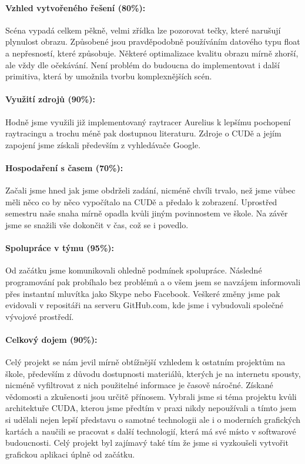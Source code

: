 \documentclass[11pt,a4paper]{article}
\begin{document}
\paragraph{Vzhled vytvořeného řešení (80\%):} 
Scéna vypadá celkem pěkně, velmi zřídka lze pozorovat tečky, které narušují plynulost obrazu. Způsobené jsou pravděpodobně používáním datového typu float a nepřesností, které způsobuje. Některé optimalizace kvalitu obrazu mírně zhorší, ale vždy dle očekávání. Není problém do budoucna do implementovat i další primitiva, která by umožnila tvorbu komplexnějších scén.

\paragraph{Využití zdrojů (90\%):}
Hodně jsme využili již implementovaný raytracer Aurelius k lepšímu pochopení raytracingu a trochu méně pak dostupnou literaturu. Zdroje o CUDě a jejím zapojení jsme získali především z vyhledávače Google.

\paragraph{Hospodaření s časem (70\%):}
Začali jsme hned jak jsme obdrželi zadání, nicméně chvíli trvalo, než jsme vůbec měli něco co by něco vypočítalo na CUDě a předalo k zobrazení. Uprostřed semestru naše snaha mírně opadla kvůli jiným povinnostem ve škole. Na závěr jsme se snažili vše dokončit v čas, což se i povedlo.

\paragraph{Spolupráce v týmu (95\%):}
Od začátku jsme komunikovali ohledně podmínek spolupráce. Následné programování pak probíhalo bez problémů a o všem jsem se navzájem informovali přes instantní mluvítka jako Skype nebo Facebook. Veškeré změny jsme pak evidovali v repositáři na serveru GitHub.com, kde jsme i vybudovali společné vývojové prostředí.

\paragraph{Celkový dojem (90\%):} 
Celý projekt se nám jevil mírně obtížnější vzhledem k ostatním projektům na škole, především z důvodu dostupnosti materiálů, kterých je na internetu spousty, nicméně vyfiltrovat z nich použitelné informace je časově náročné. 
Získané vědomosti a zkušenosti jsou určitě přínosem. 
Vybrali jsme si téma projektu kvůli architektuře CUDA, kterou jsme předtím v praxi nikdy nepoužívali a tímto jsem si udělali nejen lepší představu o samotné technologii ale i o moderních grafických kartách a naučili se pracovat s další technologií, která má své místo v softwarové budoucnosti. Celý projekt byl zajímavý také tím že jsme si vyzkoušeli vytvořit grafickou aplikaci úplně od začátku.
\end{document}

